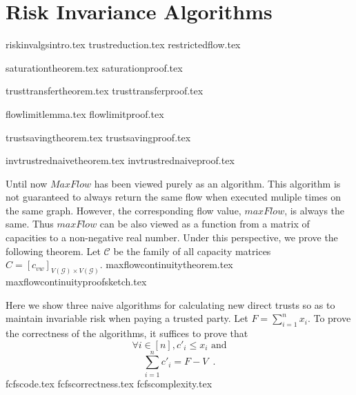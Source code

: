 \section{Risk Invariance Algorithms}
  {riskinvalgsintro.tex}
  {trustreduction.tex}
  {restrictedflow.tex}

  {saturationtheorem.tex}
  {saturationproof.tex}

  {trusttransfertheorem.tex}
  {trusttransferproof.tex}

  {flowlimitlemma.tex}
  {flowlimitproof.tex}

  {trustsavingtheorem.tex}
  {trustsavingproof.tex}

  {invtrustrednaivetheorem.tex}
  {invtrustrednaiveproof.tex}

  Until now $MaxFlow$ has been viewed purely as an algorithm. This algorithm is not guaranteed to always return the same
  flow when executed muliple times on the same graph. However, the corresponding flow value, $maxFlow$, is always the same.
  Thus $maxFlow$ can be also viewed as a function from a matrix of capacities to a non-negative real number. Under this
  perspective, we prove the following theorem. Let $\mathcal{C}$ be the family of all capacity matrices
  $C = [c_{vw}]_{V\left(\mathcal{G}\right) \times V\left(\mathcal{G}\right)}$.
  {maxflowcontinuitytheorem.tex}
  {maxflowcontinuityproofsketch.tex}

  Here we show three naive algorithms for calculating new direct trusts so as to maintain invariable risk when paying
  a trusted party. Let $F = \sum\limits_{i=1}^{n}x_i$. To prove the correctness of the algorithms, it suffices to prove that
  \begin{equation}
  \label{naive:req1}
     \forall i \in [n], c'_i \leq x_i \mbox{ and}
  \end{equation}
  \begin{equation}
  \label{naive:req2}
     \sum\limits_{i=1}^{n}c'_i = F - V \enspace.
  \end{equation}
  {fcfscode.tex}
  {fcfscorrectness.tex}
  {fcfscomplexity.tex}

